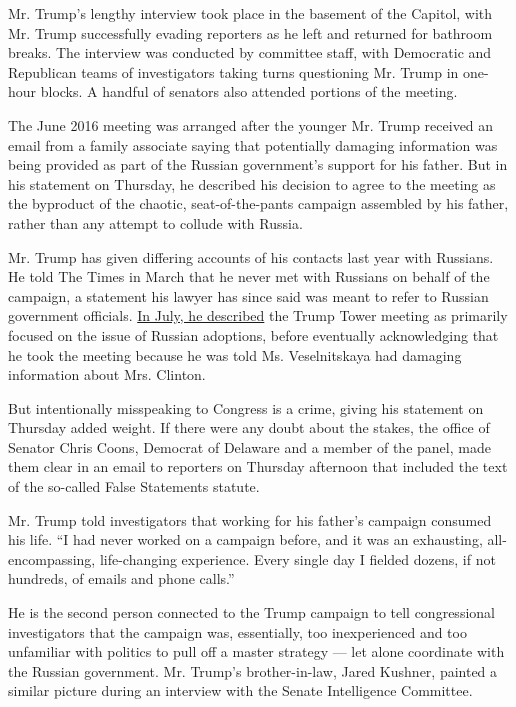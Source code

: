 Mr. Trump's lengthy interview took place in the basement of the Capitol,
with Mr. Trump successfully evading reporters as he left and returned
for bathroom breaks. The interview was conducted by committee staff,
with Democratic and Republican teams of investigators taking turns
questioning Mr. Trump in one-hour blocks. A handful of senators also
attended portions of the meeting.

The June 2016 meeting was arranged after the younger Mr. Trump received
an email from a family associate saying that potentially damaging
information was being provided as part of the Russian government's
support for his father. But in his statement on Thursday, he described
his decision to agree to the meeting as the byproduct of the chaotic,
seat-of-the-pants campaign assembled by his father, rather than any
attempt to collude with Russia.

Mr. Trump has given differing accounts of his contacts last year with
Russians. He told The Times in March that he never met with Russians on
behalf of the campaign, a statement his lawyer has since said was meant
to refer to Russian government officials.
\href{https://www.nytimes3xbfgragh.onion/2017/07/08/us/politics/trump-russia-kushner-manafort.html}{In
July, he described} the Trump Tower meeting as primarily focused on the
issue of Russian adoptions, before eventually acknowledging that he took
the meeting because he was told Ms. Veselnitskaya had damaging
information about Mrs. Clinton.

But intentionally misspeaking to Congress is a crime, giving his
statement on Thursday added weight. If there were any doubt about the
stakes, the office of Senator Chris Coons, Democrat of Delaware and a
member of the panel, made them clear in an email to reporters on
Thursday afternoon that included the text of the so-called False
Statements statute.

Mr. Trump told investigators that working for his father's campaign
consumed his life. ``I had never worked on a campaign before, and it was
an exhausting, all-encompassing, life-changing experience. Every single
day I fielded dozens, if not hundreds, of emails and phone calls.''

He is the second person connected to the Trump campaign to tell
congressional investigators that the campaign was, essentially, too
inexperienced and too unfamiliar with politics to pull off a master
strategy --- let alone coordinate with the Russian government. Mr.
Trump's brother-in-law, Jared Kushner, painted a similar picture during
an interview with the Senate Intelligence Committee.


